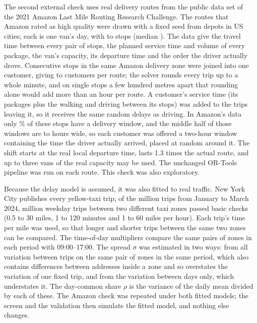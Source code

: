 \documentclass[12pt,letterpaper]{article}
\begin{document}
The second external check uses real delivery routes from the public data set of
the 2021 Amazon Last Mile Routing Research Challenge\cite{merchan2022}. The \AmzRoutes{} routes
that Amazon rated as high quality were drawn with a fixed seed from
\AmzStations{} depots in \AmzCities{} US cities; each is one van's day, with
\AmzStopsMin{} to \AmzStopsMax{} stops (median \AmzStopsMed). The data give the
travel time between every pair of stops, the planned service time and volume of
every package, the van's capacity, its departure time and the order the driver
actually drove. Consecutive stops in the same Amazon delivery zone were joined into
one customer, giving \AmzCustMin{} to \AmzCustMax{} customers per route; the
solver rounds every trip up to a whole minute, and on single stops a few hundred
metres apart that rounding alone would add more than an hour per route. A
customer's service time (its packages plus the walking and driving between its
stops) was added to the trips leaving it, so it receives the same random delays as
driving. In Amazon's data only \AmzWindowShare\% of these stops have a delivery window,
and the middle half of those windows are \AmzWindowLo{} to \AmzWindowHi{} hours wide, so each customer was offered a two-hour window containing the time the
driver actually arrived, placed at random around it. The shift starts at the real
local departure time, lasts 1.3 times the actual route, and up to three vans of the
real capacity may be used. The unchanged OR-Tools pipeline was run on each route.
This check was also exploratory.

Because the delay model is assumed, it was also fitted to real traffic. New York
City publishes every yellow-taxi trip\cite{nyctlc2024}; of the \NycRawM{} million
trips from January to March 2024, \NycTripsM{} million weekday trips between two
different taxi zones passed basic checks (0.5 to 30 miles, 1 to 120 minutes and 1
to 60 miles per hour). Each trip's time per mile was used, so that longer and
shorter trips between the same two zones can be compared. The time-of-day
multipliers compare the same pairs of zones in each period with 09:00--17:00. The
spread $\sigma$ was estimated in two ways: from all variation between trips on the
same pair of zones in the same period, which also contains differences between
addresses inside a zone and so overstates the variation of one fixed trip, and from
the variation between days only, which understates it. The day-common share $\rho$
is the variance of the daily mean divided by each of these. The Amazon check was
repeated under both fitted models; the screen and the validation then simulate the
fitted model, and nothing else changes.
\end{document}
